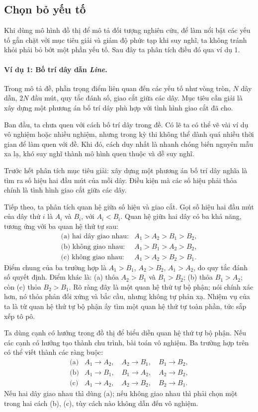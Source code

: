 \documentclass[11pt]{article}
\begin{document}
\subsection{Chọn bỏ yếu tố}

Khi dùng mô hình đồ thị để mô tả đối tượng nghiên cứu, để làm nổi bật các yếu
tố gắn chặt với mục tiêu giải và giảm độ phức tạp khi suy nghĩ, ta không
tránh khỏi phải bỏ bớt một phần yếu tố. Sau đây ta phân tích điều đó qua ví
dụ 1.

\paragraph{Ví dụ 1: Bố trí dây dẫn \textit{Line}.}
Trong mô tả đề, phần trọng điểm liên quan đến các yếu tố như vòng tròn, \(N\)
dây dẫn, \(2N\) đầu mút, quy tắc đánh số, giao cắt giữa các dây. Mục tiêu
cần giải là xây dựng một phương án bố trí dây phù hợp với tình hình giao cắt
đã cho.

Ban đầu, ta chưa quen với cách bố trí dây trong đề. Có lẽ ta có thể vẽ vài
ví dụ vô nghiệm hoặc nhiều nghiệm, nhưng trong kỳ thi không thể dành quá
nhiều thời gian để làm quen với đề. Khi đó, cách duy nhất là nhanh chóng biến
nguyên mẫu xa lạ, khó suy nghĩ thành mô hình quen thuộc và dễ suy nghĩ.

Trước hết phân tích mục tiêu giải: xây dựng một phương án bố trí dây nghĩa là
tìm ra số hiệu hai đầu mút của mỗi dây. Điều kiện mà các số hiệu phải thỏa
chính là tình hình giao cắt giữa các dây.

Tiếp theo, ta phân tích quan hệ giữa số hiệu và giao cắt. Gọi số hiệu hai đầu
mút của dây thứ \(i\) là \(A_i\) và \(B_i\), với \(A_i<B_i\). Quan hệ giữa
hai dây có ba khả năng, tương ứng với ba quan hệ thứ tự sau:
\[
\begin{array}{ll}
  \text{(a) hai dây giao nhau:} & A_1>A_2>B_1>B_2,\\
  \text{(b) không giao nhau:} & A_1>B_1>A_2>B_2,\\
  \text{(c) không giao nhau:} & A_1>A_2>B_2>B_1.
\end{array}
\]
Điểm chung của ba trường hợp là \(A_1>B_1\), \(A_2>B_2\), \(A_1>A_2\), do
quy tắc đánh số quyết định. Điểm khác là: (a) thỏa \(A_2>B_1\) và \(B_1>B_2\);
(b) thỏa \(B_1>A_2\); còn (c) thỏa \(B_2>B_1\). Rõ ràng đây là một quan hệ
thứ tự bộ phận; nói chính xác hơn, nó thỏa phản đối xứng và bắc cầu, nhưng
không tự phản xạ. Nhiệm vụ của ta là từ quan hệ thứ tự bộ phận ấy tìm một
quan hệ thứ tự toàn phần, tức sắp xếp tô pô.

Ta dùng cạnh có hướng trong đồ thị để biểu diễn quan hệ thứ tự bộ phận. Nếu
các cạnh có hướng tạo thành chu trình, bài toán vô nghiệm. Ba trường hợp trên
có thể viết thành các ràng buộc:
\[
\begin{array}{ll}
  \text{(a)} & A_1\to A_2,\quad A_2\to B_1,\quad B_1\to B_2,\\
  \text{(b)} & A_1\to B_1,\quad B_1\to A_2,\quad A_2\to B_2,\\
  \text{(c)} & A_1\to A_2,\quad A_2\to B_2,\quad B_2\to B_1.
\end{array}
\]
Nếu hai dây giao nhau thì dùng (a); nếu không giao nhau thì phải chọn một
trong hai cách (b), (c), tùy cách nào không dẫn đến vô nghiệm.
\end{document}
